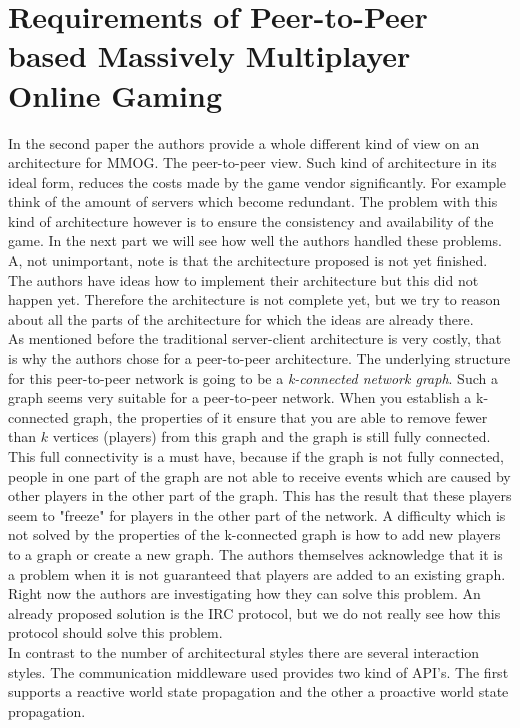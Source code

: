 \section*{Requirements of Peer-to-Peer based Massively Multiplayer Online Gaming}
In the second paper the authors \cite{peer} provide a whole different kind of view on an architecture for MMOG. 
The peer-to-peer view. 
Such kind of architecture in its ideal form, reduces the costs made by the game vendor significantly. 
For example think of the amount of servers which become redundant. 
The problem with this kind of architecture however is to ensure the consistency and availability of the game. 
In the next part we will see how well the authors handled these problems. 
A, not unimportant, note is that the architecture proposed is not yet finished. 
The authors have ideas how to implement their architecture but this did not happen yet. 
Therefore the architecture is not complete yet, but we try to reason about all the parts of the architecture for which the ideas are already there.\\
\indent As mentioned before the traditional server-client architecture is very costly, that is why the authors chose for a peer-to-peer architecture. 
The underlying structure for this peer-to-peer network is going to be a \emph{k-connected network graph}. 
Such a graph seems very suitable for a peer-to-peer network. 
When you establish a k-connected graph, the properties of it ensure that you are able to remove fewer than $k$ vertices (players) from this graph and the graph is still fully connected. 
This full connectivity is a must have, because if the graph is not fully connected, people in one part of the graph are not able to receive events which are caused by other players in the other part of the graph.
This has the result that these players seem to "freeze" for players in the other part of the network. 
A difficulty which is not solved by the properties of the k-connected graph is how to add new players to a graph or create a new graph. 
The authors themselves acknowledge that it is a problem when it is not guaranteed that players are added to an existing graph. 
Right now the authors are investigating how they can solve this problem. 
An already proposed solution is the IRC protocol, but we do not really see how this protocol should solve this problem.\\
\indent In contrast to the number of architectural styles there are several interaction styles. 
The communication middleware used provides two kind of API's. 
The first supports a reactive world state propagation and the other a proactive world state propagation. 
